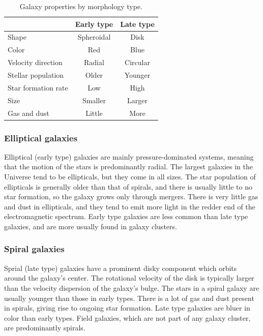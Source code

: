 \begin{table}
\begin{center}
\caption{Galaxy properties by morphology type.}
\label{morphologies}
\begin{tabular} { l| c c } 
 \hline
 \hline
  & Early type & Late type \\
 \hline
 Shape & Spheroidal & Disk \\
 Color & Red & Blue \\
 Velocity direction & Radial & Circular \\
 Stellar population & Older & Younger \\
 Star formation rate & Low & High \\
 Size & Smaller & Larger \\
 Gas and dust & Little & More \\
  
 \hline 
\end{tabular}
\end{center}
\end{table}

\subsubsection{Elliptical galaxies}
Elliptical (early type) galaxies are mainly pressure-dominated systems, meaning that the motion of the stars is predominantly radial. The largest galaxies in the Universe tend to be ellipticals, but they come in all sizes. The star population of ellipticals is generally older than that of spirals, and there is usually little to no star formation, so the galaxy grows only through mergers. There is very little gas and dust in ellipticals, and they tend to emit more light in the redder end of the electromagnetic spectrum. Early type galaxies are less common than late type galaxies, and are more usually found in galaxy clusters.

\subsubsection{Spiral galaxies} \label{lates}
Sprial (late type) galaxies have a prominent disky component which orbits around the galaxy's center. The rotational velocity of the disk is typically larger than the velocity dispersion of the galaxy's bulge. The stars in a spiral galaxy are usually younger than those in early types. There is a lot of gas and dust present in spirals, giving rise to ongoing star formation. Late type galaxies are bluer in color than early types. Field galaxies, which are not part of any galaxy cluster, are predominantly spirals. 


